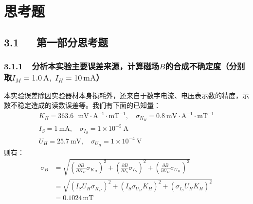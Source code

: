 \documentclass[UTF8]{article}
\theoremstyle{MyLineTheoremStyle} %
\theoremstyle{MyBlockTheoremStyle} %
\theoremstyle{MySubsubsectionStyle} %
\begin{document}
\newpage


\section{思考题}

\subsection*{3.1\ \ \ 第一部分思考题}
\subsubsection*{3.1.1\ \ 分析本实验主要误差来源，计算磁场$ B $的合成不确定度（分别取$ I_M=1.0\,\mathrm A,\;I_H=10\,\mathrm{mA} $）}

本实验误差除因实验器材本身损耗外，还来自于数字电流、电压表示数的精度，示数不稳定造成的读数误差等。我们有下面的已知量：
\begin{gather}
    K_H = 363.6 \  \  \ \mathrm{mV}\cdot \mathrm{A^{-1}}\cdot \mathrm{mT}^{-1},\quad \sigma_{K_H} = 0.8\ \mathrm{mV}\cdot \mathrm{A^{-1}}\cdot \mathrm{mT}^{-1} \\
    I_S = 1 \ \mathrm{mA},\quad \sigma_{I_S} = 1\times10^{-5} \ \mathrm{A} \\
    U_H = 25.7 \ \mathrm{mV},\quad \sigma_{U_H} = 1\times10^{-4} \ \mathrm{V}
\end{gather}
则有：
\begin{align}
    \sigma_B & =\sqrt{\left(\frac{\partial B}{\partial K_H}\sigma_{K_H}\right)^2+\left(\frac{\partial B}{\partial I_S}\sigma_{I_S}\right)^2+\left(\frac{\partial B}{\partial U_H}\sigma_{U_H}\right)^2}\\
    & =\sqrt{(I_SU_H\sigma_{K_H})^2+(I_S\sigma_{U_H}K_H)^2+(\sigma_{I_S}U_HK_H)^2}\\
    & = 0.1024 \,\mathrm{mT}
\end{align}
\end{document}
